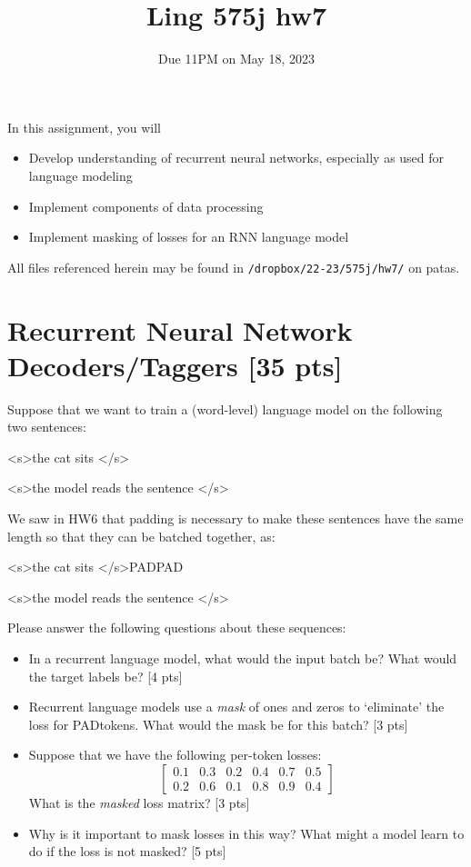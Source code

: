 \documentclass[11pt]{article}
\newcommand{\bos}{\textless s\textgreater\:}
\newcommand{\eos}{\textless /s\textgreater\:}
\newcommand{\pad}{PAD\:}
\begin{document}
\title{Ling 575j hw7}
\date{\vspace{-0.2in}Due 11PM on May 18, 2023}
\maketitle


\noindent In this assignment, you will 
\begin{itemize}
  \item Develop understanding of recurrent neural networks, especially as used for language modeling
  \item Implement components of data processing 
  \item Implement masking of losses for an RNN language model
\end{itemize}
All files referenced herein may be found in \texttt{/dropbox/22-23/575j/hw7/} on patas.


\section{Recurrent Neural Network Decoders/Taggers [35 pts]}

  Suppose that we want to train a (word-level) language model on the following two sentences:
\begin{center}
  \bos the cat sits \eos

  \bos the model reads the sentence \eos
\end{center}
We saw in HW6 that padding is necessary to make these sentences have the same length so that they can be batched together, as:
\begin{center}
  \bos the cat sits \eos \pad \pad

  \bos the model reads the sentence \eos
\end{center}
Please answer the following questions about these sequences:
\begin{itemize}
  \item In a recurrent language model, what would the input batch be?  What would the target labels be? \hfill [4 pts]
  \item Recurrent language models use a \emph{mask} of ones and zeros to `eliminate' the loss for \pad tokens.  What would the mask be for this batch? \hfill [3 pts]
  \item Suppose that we have the following per-token losses:
    \[ \begin{bmatrix} 0.1 & 0.3 & 0.2 & 0.4 & 0.7 & 0.5 \\ 0.2 & 0.6 & 0.1 & 0.8 & 0.9 & 0.4 \end{bmatrix} \]
    What is the \emph{masked} loss matrix? \hfill [3 pts]
  \item Why is it important to mask losses in this way?  What might a model learn to do if the loss is not masked? \hfill [5 pts]
\end{itemize}
\end{document}
